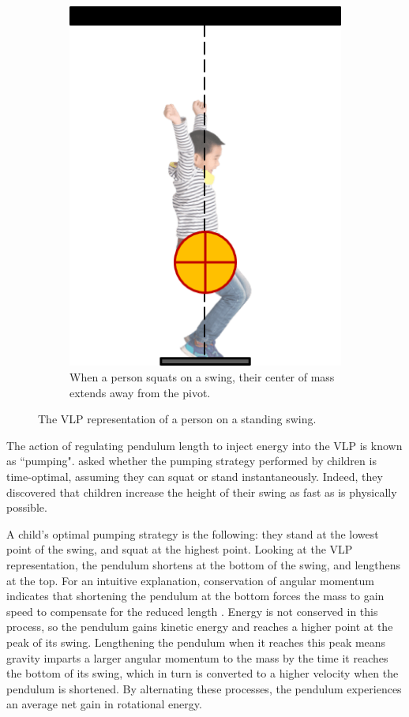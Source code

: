 \begin{figure}
\begin{subfigure}[t]{0.45\textwidth}
      \includegraphics[]{images/child_vlp_squatting.png}
      \caption{When a person squats on a swing, their center of mass extends
      away from the pivot.}
   \end{subfigure}
   \caption{The VLP representation of a person on a standing swing.}
   \label{fig:child-vlp}
\end{figure}

The action of regulating pendulum length to inject energy into the VLP is known as
``pumping". 
\citet{pumping_swing_standing_squatting} asked whether the pumping strategy
performed by children is time-optimal, assuming they can squat or
stand instantaneously.
Indeed, they discovered that children increase the height of their swing as fast
as is physically possible.

A child's optimal pumping strategy is the following: 
they stand at the lowest point of the swing, and squat at the highest point.
Looking at the VLP representation, the pendulum shortens at the bottom of the
swing, and lengthens at the top. 
For an intuitive explanation, conservation of angular momentum indicates that
shortening the pendulum at the bottom forces the mass to gain speed to
compensate for the reduced length \cite{how_to_pump_a_swing}.
Energy is not conserved in this process, so the pendulum gains kinetic energy
and reaches a higher point at the peak of its swing.
Lengthening the pendulum when it reaches this peak means gravity
imparts a larger angular momentum to the mass by the time it reaches the bottom
of its swing, which in turn is converted to a higher velocity when the
pendulum is shortened.
By alternating these processes, the pendulum experiences an average net gain in
rotational energy.

